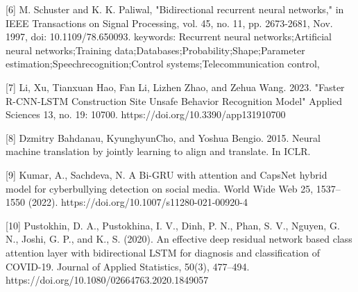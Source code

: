 \documentclass{article}
\begin{document}
[6] M. Schuster and K. K. Paliwal, "Bidirectional recurrent neural networks," in IEEE Transactions on Signal Processing, vol. 45, no. 11, pp. 2673-2681, Nov. 1997, doi: 10.1109/78.650093. keywords: Recurrent neural networks;Artificial neural networks;Training data;Databases;Probability;Shape;Parameter estimation;Speechrecognition;Control systems;Telecommunication control,

[7] Li, Xu, Tianxuan Hao, Fan Li, Lizhen Zhao, and Zehua Wang. 2023. "Faster R-CNN-LSTM Construction Site Unsafe Behavior Recognition Model" Applied Sciences 13, no. 19: 10700. https://doi.org/10.3390/app131910700

[8] Dzmitry Bahdanau, KyunghyunCho, and Yoshua Bengio. 2015. Neural machine translation by jointly
learning to align and translate. In ICLR.

[9] Kumar, A., Sachdeva, N. A Bi-GRU with attention and CapsNet hybrid model for cyberbullying detection on social media. World Wide Web 25, 1537–1550 (2022). https://doi.org/10.1007/s11280-021-00920-4

[10] Pustokhin, D. A., Pustokhina, I. V., Dinh, P. N., Phan, S. V., Nguyen, G. N., Joshi, G. P., and K., S. (2020). An effective deep residual network based class attention layer with bidirectional LSTM for diagnosis and classification of COVID-19. Journal of Applied Statistics, 50(3), 477–494. https://doi.org/10.1080/02664763.2020.1849057
\end{document}

